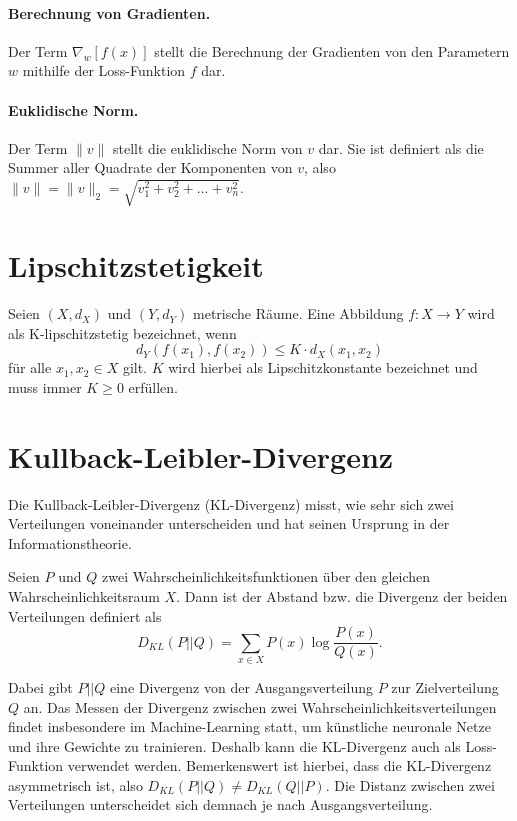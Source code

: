 \paragraph{Berechnung von Gradienten.}
Der Term $\nabla_w\left[f(x)\right]$ stellt die Berechnung der Gradienten von
den Parametern $w$ mithilfe der Loss-Funktion $f$ dar.

\paragraph{Euklidische Norm.}
Der Term $\| v \|$ stellt die euklidische Norm von $v$ dar. Sie ist definiert als die Summer aller Quadrate der Komponenten von $v$, also $\| v \| = \| v \|_2 = \sqrt{v_1^2 + v_2^2 + ... + v_n^2}$.

\section{Lipschitzstetigkeit}
\begin{definition}[K-Lipschitzstetigkeit]
Seien $(X, d_X)$ und $(Y, d_Y)$ metrische Räume. Eine Abbildung $f: X \to Y$
wird als K-lipschitzstetig bezeichnet, wenn
\[
    d_Y(f(x_1), f(x_2)) \leq K \cdot d_X(x_1, x_2)
\]
für alle $x_1, x_2 \in X$ gilt. $K$ wird hierbei als Lipschitzkonstante
bezeichnet und muss immer $K \geq 0$ erfüllen.
\end{definition}

\section{Kullback-Leibler-Divergenz}
Die Kullback-Leibler-Divergenz (KL-Divergenz) misst, wie sehr sich zwei
Verteilungen voneinander unterscheiden und hat seinen Ursprung in der
Informationstheorie. 
\begin{definition}
Seien $P$ und $Q$ zwei Wahrscheinlichkeitsfunktionen über den gleichen
Wahrscheinlichkeitsraum $X$. Dann ist der Abstand bzw. die Divergenz der
beiden Verteilungen definiert als
\[
    D_{KL}(P \lvert\lvert Q) = \sum_{x \in X} P(x) \log \frac{P(x)}{Q(x)}.
\]
\end{definition}
Dabei gibt $P \lvert\lvert Q$ eine Divergenz von der Ausgangsverteilung $P$
zur Zielverteilung $Q$ an. Das Messen der Divergenz zwischen zwei
Wahrscheinlichkeitsverteilungen findet insbesondere im Machine-Learning statt,
um künstliche neuronale Netze und ihre Gewichte zu trainieren. Deshalb kann
die KL-Divergenz auch als Loss-Funktion verwendet werden. Bemerkenswert ist
hierbei, dass die KL-Divergenz asymmetrisch ist, also $D_{KL}(P \lvert\lvert
Q) \neq D_{KL}(Q \lvert\lvert P)$. Die Distanz zwischen zwei Verteilungen
unterscheidet sich demnach je nach Ausgangsverteilung.

